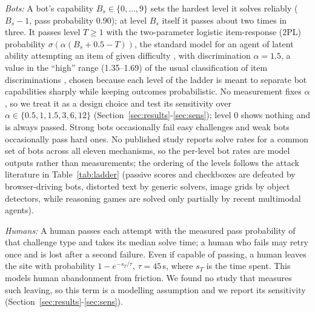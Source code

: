 \documentclass{ieeetj}
\begin{document}
\emph{Bots:} A bot's capability $B_s\in\{0,\dots,9\}$ sets the hardest level it solves reliably ($B_s-1$, pass probability 0.90); at level $B_s$ itself it passes about two times in three. 
It passes level $T\ge1$ with the two-parameter logistic item-response (2PL) probability $\sigma(\alpha(B_s+0.5-T))$, the standard model for an agent of latent ability attempting an item of given difficulty \cite{birnbaum_1968,embretson_irt_2000}, with discrimination $\alpha=1.5$, a value in the ``high'' range (1.35--1.69) of the usual classification of item discriminations \cite{baker_irt_2001}, chosen because each level of the ladder is meant to separate bot capabilities sharply while keeping outcomes probabilistic. 
No measurement fixes $\alpha$, so we treat it as a design choice and test its sensitivity over $\alpha\in\{0.5,1,1.5,3,6,12\}$ (Section~\ref{sec:results}-\ref{sec:sens}); level 0 shows nothing and is always passed. 
Strong bots occasionally fail easy challenges and weak bots occasionally pass hard ones. 
No published study reports solve rates for a common set of bots across all eleven mechanisms, so the per-level bot rates are model outputs rather than measurements; the ordering of the levels follows the attack literature in Table~\ref{tab:ladder} (passive scores and checkboxes are defeated by browser-driving bots, distorted text by generic solvers, image grids by object detectors, while reasoning games are solved only partially by recent multimodal agents). 

\emph{Humans:} A human passes each attempt with the measured pass probability of that challenge type and takes its median solve time; a human who fails may retry once and is lost after a second failure.
Even if capable of passing, a human leaves the site with probability $1-e^{-s_T/\tau}$, $\tau=45$\,s, where $s_T$ is the time spent.
This models human abandonment from friction.
We found no study that measures such leaving, so this term is a modelling assumption and we report its sensitivity (Section~\ref{sec:results}-\ref{sec:sens}).
\end{document}
